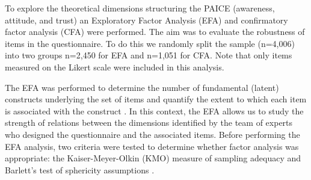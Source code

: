\documentclass{article}
\begin{document}
To explore the theoretical dimensions structuring the PAICE (awareness, attitude, and trust) an Exploratory Factor Analysis (EFA) and confirmatory factor analysis (CFA) were performed. The aim was to evaluate the robustness of items in the questionnaire. To do this we randomly split the sample (n=4,006) into two groups n=2,450 for EFA and n=1,051 for CFA.
Note that only items measured on the Likert scale were included in this analysis. 

The EFA was performed to determine the number of fundamental (latent) constructs underlying the set of items and quantify the extent to which each item is associated with the construct \cite{Tinsley2020}. 
In this context, the EFA allows us to study the strength of relations between the dimensions identified by the team of experts who designed the questionnaire and the associated items. 
Before performing the EFA analysis, two criteria were tested to determine whether factor analysis was appropriate: the Kaiser-Meyer-Olkin (KMO) measure of sampling adequacy and Barlett's test of sphericity assumptions \cite{Kaiser1974, Fabrigar1999}. 
\end{document}
